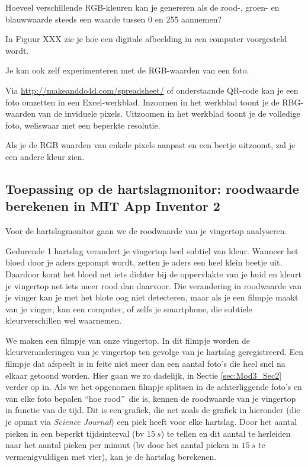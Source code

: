\begin{oef}
	Hoeveel verschillende RGB-kleuren kan je genereren als de rood-, groen- en blauwwaarde steeds een waarde tussen 0 en 255 aannemen? 
\end{oef}

In Figuur XXX zie je hoe een digitale afbeelding in een computer voorgesteld wordt.


Je kan ook zelf experimenteren met de RGB-waarden van een foto. 

Via \url{http://makeanddo4d.com/spreadsheet/} of onderstaande QR-code kan je een foto omzetten in een Excel-werkblad. Inzoomen in het werkblad toont je de RBG-waarden van de inviduele pixels. Uitzoomen in het werkblad toont je de volledige foto, weliswaar met een beperkte resolutie.



Als je de RGB waarden van enkele pixels aanpast en een beetje uitzoomt, zal je een andere kleur zien.


\subsection{Toepassing op de hartslagmonitor: roodwaarde berekenen in MIT App Inventor 2}

Voor de hartslagmonitor gaan we de roodwaarde van je vingertop analyseren. 

Gedurende 1 hartslag verandert je vingertop heel subtiel van kleur. 
Wanneer het bloed door je aders gepompt wordt, zetten je aders een heel klein beetje uit. Daardoor komt het bloed net iets dichter bij de oppervlakte van je huid en kleurt je vingertop net iets meer rood dan daarvoor.
Die verandering in roodwaarde van je vinger kan je met het blote oog niet detecteren, maar als je een filmpje maakt van je vinger, kan een computer, of zelfs je smartphone, die subtiele kleurverschillen wel waarnemen.

We maken een filmpje van onze vingertop. In dit filmpje worden de kleurveranderingen van je vingertop ten gevolge van je hartslag geregistreerd. Een filmpje dat afspeelt is in feite niet meer dan een aantal foto's die heel snel na elkaar getoond worden. Hier gaan we zo dadelijk, in Sectie \ref{sec:Mod3_Sec2} verder op in. Als we het opgenomen filmpje splitsen in de achterliggende foto's en van elke foto bepalen \textquotedblleft hoe rood\textquotedblright \  die is, kennen de roodwaarde van je vingertop in functie van de tijd. Dit is een grafiek, die net zoals de grafiek in hieronder (die je opmat via \emph{Science Journal}) een piek heeft voor elke hartslag. Door het aantal pieken in een beperkt tijdsinterval (bv $15~s$) te tellen en dit aantal te herleiden naar het aantal pieken per minuut (bv door het aantal pieken in $15~s$ te vermenigvuldigen met vier), kan je de hartslag berekenen.

